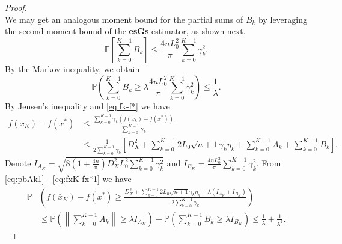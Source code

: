 \documentclass[11pt,reqno]{amsart}
\newcommand{\1}{{\bf 1}}
\newcommand{\2}{{\bf 2}}
\newcommand{\E}{\mathbb E}
\newcommand{\lc}{\left[}
\newcommand{\rc}{\right]}
\numberwithin{equation}{section}
\theoremstyle{remark}
\begin{document}
{\begin{proof}
\begin{equation}
		\end{equation}{We may get an analogous moment bound for} the partial sums of $B_k$ by {leveraging} the second moment bound of the \textbf{esGs} estimator, {as shown next.} 
		\begin{equation*}
			\E \lc {\sum_{k=0}^{K-1}B_k}  \rc \leq \frac{4nL_0^2}{\pi} \sum_{k=0}^{K-1}\gamma_k^2.
		\end{equation*}
		By the Markov inequality, we obtain
		\begin{equation}\label{eq:pbBk1}
			\mathbb{P}\left(\sum_{k=0}^{K-1}B_k\geq \lambda\frac{4nL_0^2}{\pi} \sum_{k=0}^{K-1}\gamma_k^2\right)\leq \frac{1}{\lambda}.
		\end{equation}
		By Jensen's inequality and \eqref{eq:fk-f*} we have 
		\begin{align}\label{eq:fxK-fx*1}
			f(\bar{x}_K)-f(x^*)&\leq\frac{\sum_{k=0}^{K-1}\gamma_k \left(f(x_k)-f(x^*)\right)}{\sum_{k=0}^{K-1} \gamma_k} \nonumber\\
			&\leq \frac{1}{2\sum_{k=0}^{K-1} \gamma_k}\left[D_X^2+\sum_{k=0}^{K-1}2L_0\sqrt{n+1}\gamma_k\eta_k 
			+\sum_{k=0}^{K-1}A_k+\sum_{k=0}^{K-1}B_k\right].
		\end{align}
		Denote $I_{A_K}=\sqrt{8\left(1+\frac{4n}{\pi}\right)D_X^2L_0^2\sum_{k=0}^{K-1}\gamma_k^2}$ and $I_{B_K}=\frac{4nL_0^2}{\pi} \sum_{k=0}^{K-1}\gamma_k^2$. From \eqref{eq:pbAk1} - \eqref{eq:fxK-fx*1} we have
		\begin{align*}
			\mathbb{P}&\left(f(\bar{x}_K)-f(x^*)\geq \frac{D_X^2+\sum_{k=0}^{K-1}2L_0\sqrt{n+1}\gamma_k\eta_k 
				+\lambda\left(I_{A_K}+I_{B_K}\right)}{2\sum_{k=0}^{K-1} \gamma_k}\right)\\
			&\leq \mathbb{P}\left(\left\|\sum_{k=0}^{K-1}A_k\right\|\geq \lambda I_{A_K}\right)+	\mathbb{P}\left(\sum_{k=0}^{K-1}B_k\geq \lambda I_{B_K}\right)\leq \frac{1}{\lambda}+\frac{1}{\lambda^2}.
		\end{align*}
		

\end{proof}}
\end{document}
